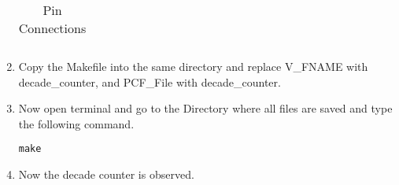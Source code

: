 \documentclass[journal,12pt,twocolumn]{IEEEtran}
\begin{document}
\begin{enumerate}
\begin{table}
\begin{center}
\begin{tabular}{ | m{3em} | m{2cm}| }
\end{tabular}
\end{center}
\caption{Pin Connections}
\label{table:2}

\end{table}
    
    \item Copy the Makefile into the same directory and replace V\_FNAME with decade\_counter, and PCF\_File with decade\_counter.
    
    \item Now open terminal and go to the Directory where all files are saved and type the following command.
    \begin{verbatim}
make
    \end{verbatim}
    \item Now the decade counter is observed.

\end{enumerate}
 
\end{document}
